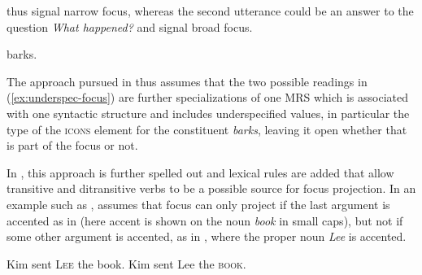 \documentclass[output=paper]{langsci/langscibook}
\begin{document}
thus signal narrow focus, whereas the second utterance could be an answer
to the question \textit{What happened?} and signal broad focus.
\begin{exe}
  \ex\label{ex:underspec-focus}
  \begin{xlist}
     barks.
  \end{xlist}
\end{exe}
The approach pursued in \cite{song-bender:2012} thus assumes that the
two possible readings in (\ref{ex:underspec-focus}) are further
specializations of one MRS which is associated with one syntactic
structure and includes underspecified values, in particular the type
of the \textsc{icons} element for the constituent \textit{barks},
leaving it open whether that is part of the focus or not.

In \cite{song2018}, this approach is further spelled out and lexical
rules are added that allow transitive and ditransitive verbs to be a possible
source for focus projection. In an example such as
, \cite{song2018} assumes that focus can
only project if the last argument is accented as in
 (here accent is shown on the noun \textit{book} in
  small caps), but not if some other argument is accented, as in
  , where the proper noun \textit{Lee}
  is accented.

\begin{exe}
  \ex\label{ex:song-ditrans-focus}
  \begin{xlist}
    \ex Kim sent  \textsc{Lee} the book.\label{ex:song-ditrans-focus-a}
    \ex Kim sent Lee the \textsc{book}.\label{ex:song-ditrans-focus-b}
  \end{xlist}
\end{exe}
\end{document}
